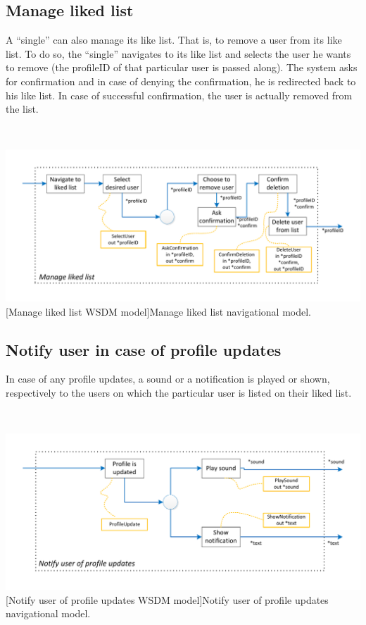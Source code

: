 \documentclass[11pt, a4paper,svglistings,oneside]{book}
\begin{document}
\subsection{Manage liked list}

A ``single'' can also manage its like list. That is, to remove a user from its like list. To do so, the ``single'' navigates to its like list and selects the user he wants to remove (the profileID of that particular user is passed along). The system asks for confirmation and in case of denying the confirmation, he is redirected back to his like list. In case of successful confirmation, the user is actually removed from the list.

$\;$ \\
\noindent\begin{minipage}{\textwidth}
    \centering
   \includegraphics[scale=0.9]{nav_ManageLikedList.pdf}
 [Manage liked list WSDM model]{Manage liked list navigational model.}
\end{minipage}

\subsection{Notify user in case of profile updates}

In case of any profile updates, a sound or a notification is played or shown, respectively to the users on which the particular user is listed on their liked list.

$\;$ \\
\noindent\begin{minipage}{\textwidth}
    \centering
   \includegraphics[scale=0.95]{nav_NotifyProfileUpdate.pdf}
 [Notify user of profile updates WSDM model]{Notify user of profile updates navigational model.}
\end{minipage}
\end{document}
